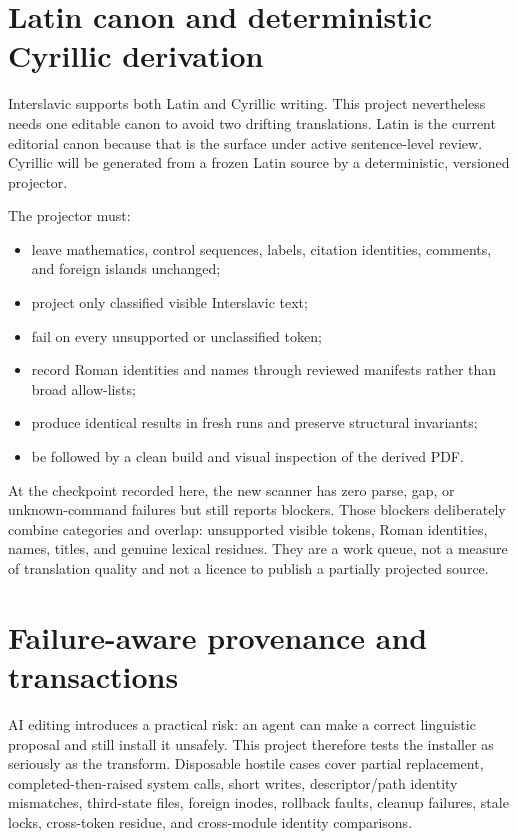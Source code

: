 \documentclass[11pt,a4paper]{article}
\begin{document}
\section{Latin canon and deterministic Cyrillic derivation}

Interslavic supports both Latin and Cyrillic writing. This project nevertheless needs one editable canon to avoid two drifting translations. Latin is the current editorial canon because that is the surface under active sentence-level review. Cyrillic will be generated from a frozen Latin source by a deterministic, versioned projector.

The projector must:

\begin{itemize}
  \item leave mathematics, control sequences, labels, citation identities, comments, and foreign islands unchanged;
  \item project only classified visible Interslavic text;
  \item fail on every unsupported or unclassified token;
  \item record Roman identities and names through reviewed manifests rather than broad allow-lists;
  \item produce identical results in fresh runs and preserve structural invariants;
  \item be followed by a clean build and visual inspection of the derived PDF.
\end{itemize}

At the checkpoint recorded here, the new scanner has zero parse, gap, or unknown-command failures but still reports blockers. Those blockers deliberately combine categories and overlap: unsupported visible tokens, Roman identities, names, titles, and genuine lexical residues. They are a work queue, not a measure of translation quality and not a licence to publish a partially projected source.

\section{Failure-aware provenance and transactions}

AI editing introduces a practical risk: an agent can make a correct linguistic proposal and still install it unsafely. This project therefore tests the installer as seriously as the transform. Disposable hostile cases cover partial replacement, completed-then-raised system calls, short writes, descriptor/path identity mismatches, third-state files, foreign inodes, rollback faults, cleanup failures, stale locks, cross-token residue, and cross-module identity comparisons.
\end{document}
